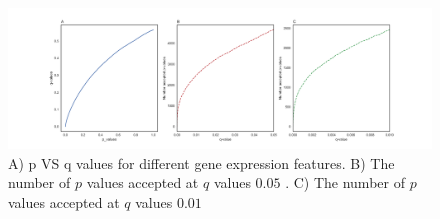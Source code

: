 \documentclass[11pt]{article}
\begin{document}
	
\begin{figure}
\centering
     \includegraphics[width=1.1\textwidth]{comb.png}
    \caption{A) p VS q values for  different gene expression features. B) The number of $p$ values accepted at $q$ values $0.05$ . C) The number of $p$ values accepted at $q$ values $0.01$}
    \label{fig:animals}
\end{figure}



\newpage


\end{document}
